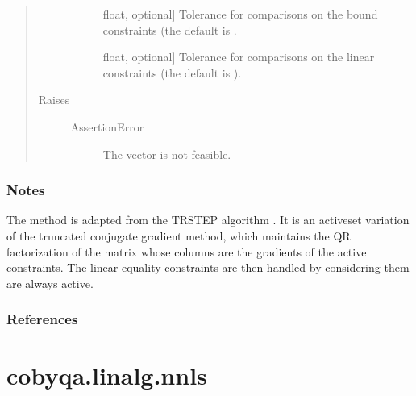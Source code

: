 \documentclass[letterpaper,10pt,english]{sphinxmanual}
\begin{document}
\begin{fulllineitems}
\begin{quote}
\begin{description}
\begin{description}
\item[{}] \leavevmode{[}float, optional{]}
\sphinxAtStartPar
Tolerance for comparisons on the bound constraints (the default is
.

\item[{}] \leavevmode{[}float, optional{]}
\sphinxAtStartPar
Tolerance for comparisons on the linear constraints (the default is
).

\end{description}

\item[{Raises}] \leavevmode\begin{description}
\item[{AssertionError}] \leavevmode
\sphinxAtStartPar
The vector  is not feasible.

\end{description}

\end{description}\end{quote}
\subsubsection*{Notes}

\sphinxAtStartPar
The method is adapted from the TRSTEP algorithm . It is an active\sphinxhyphen{}set
variation of the truncated conjugate gradient method, which maintains the QR
factorization of the matrix whose columns are the gradients of the active
constraints. The linear equality constraints are then handled by considering
them are always active.
\subsubsection*{References}

\sphinxAtStartPar
{}

\end{fulllineitems}



\section{cobyqa.linalg.nnls}
\label{\detokenize{refs/generated/cobyqa.linalg.nnls:cobyqa-linalg-nnls}}\label{\detokenize{refs/generated/cobyqa.linalg.nnls::doc}}
\end{document}
